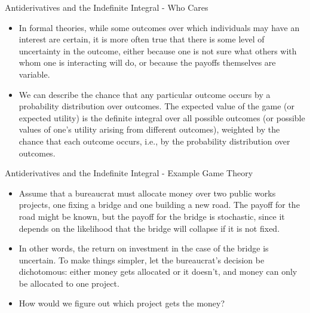 \documentclass[
  ignorenonframetext,
]{beamer}
\begin{document}
\begin{frame}{Antiderivatives and the Indefinite Integral - Who Cares}
\protect\hypertarget{antiderivatives-and-the-indefinite-integral---who-cares-1}{}

\begin{itemize}
\item
  In formal theories, while some outcomes over which individuals may
  have an interest are certain, it is more often true that there is some
  level of uncertainty in the outcome, either because one is not sure
  what others with whom one is interacting will do, or because the
  payoffs themselves are variable.
\item
  We can describe the chance that any particular outcome occurs by a
  probability distribution over outcomes. The expected value of the game
  (or expected utility) is the definite integral over all possible
  outcomes (or possible values of one's utility arising from different
  outcomes), weighted by the chance that each outcome occurs, i.e., by
  the probability distribution over outcomes.
\end{itemize}

\end{frame}

\begin{frame}{Antiderivatives and the Indefinite Integral - Example Game
Theory}
\protect\hypertarget{antiderivatives-and-the-indefinite-integral---example-game-theory}{}

\begin{itemize}
\item
  Assume that a bureaucrat must allocate money over two public works
  projects, one fixing a bridge and one building a new road. The payoff
  for the road might be known, but the payoff for the bridge is
  stochastic, since it depends on the likelihood that the bridge will
  collapse if it is not fixed.
\item
  In other words, the return on investment in the case of the bridge is
  uncertain. To make things simpler, let the bureaucrat's decision be
  dichotomous: either money gets allocated or it doesn't, and money can
  only be allocated to one project.
\item
  How would we figure out which project gets the money?
\end{itemize}

\end{frame}
\end{document}
